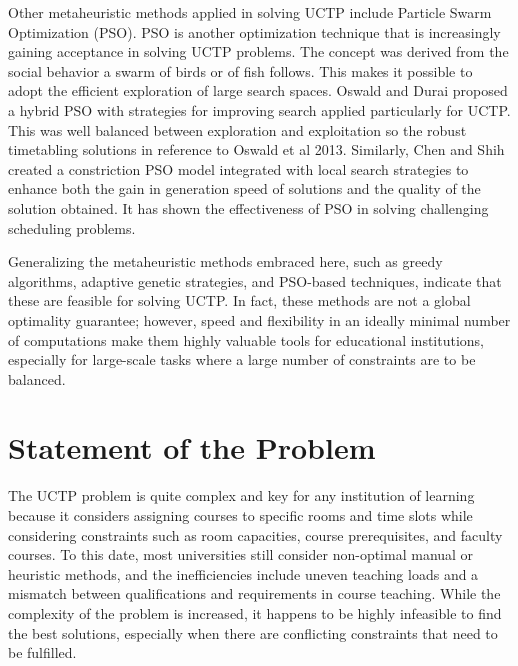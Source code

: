 \documentclass{article}
\newenvironment{subs}
  {\adjustwidth{3em}{0pt}}
  {\endadjustwidth}
\begin{document}
\begin{subs}
Other metaheuristic methods applied in solving UCTP include Particle Swarm Optimization (PSO). PSO is another optimization technique that is increasingly gaining acceptance in solving UCTP problems. The concept was derived from the social behavior a swarm of birds or of fish follows. This makes it possible to adopt the efficient exploration of large search spaces. Oswald and Durai \cite{Oswald_C2013-zo} proposed a hybrid PSO with strategies for improving search applied particularly for UCTP. This was well balanced between exploration and exploitation so the robust timetabling solutions in reference to Oswald et al 2013. Similarly, Chen and Shih \cite{Chen2013-cp} created a constriction PSO model integrated with local search strategies to enhance both the gain in generation speed of solutions and the quality of the solution obtained. It has shown the effectiveness of PSO in solving challenging scheduling problems.

Generalizing the metaheuristic methods embraced here, such as greedy algorithms, adaptive genetic strategies, and PSO-based techniques, indicate that these are feasible for solving UCTP. In fact, these methods are not a global optimality guarantee; however, speed and flexibility in an ideally minimal number of computations make them highly valuable tools for educational institutions, especially for large-scale tasks where a large number of constraints are to be balanced.

\end{subs}


\section{Statement of the Problem}
\label{sec:problemstatement}

The UCTP problem is quite complex and key for any institution of learning because it considers assigning courses to specific rooms and time slots while considering constraints such as room capacities, course prerequisites, and faculty courses. \cite{Arratia-Martinez2021-io} To this date, most universities still consider non-optimal manual or heuristic methods, and the inefficiencies include uneven teaching loads and a mismatch between qualifications and requirements in course teaching. \cite{Oswald_C2013-zo} \cite{Gunawan2008-ga} While the complexity of the problem is increased, it happens to be highly infeasible to find the best solutions, especially when there are conflicting constraints that need to be fulfilled. 
\end{document}
